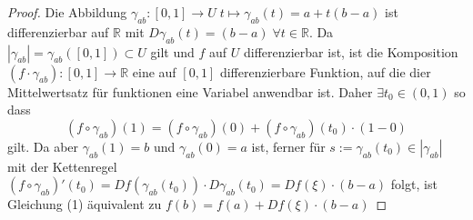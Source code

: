\begin{proof}
	Die Abbildung $ \gamma_{ab}: [0,1] \to U \; t \mapsto \gamma_{ab}(t) = a + t(b-a) $ ist differenzierbar auf $ \mathbb{R}  $ 
	mit $ D \gamma_{ab}(t) = (b-a) \; \forall t \in \mathbb{R}  $. Da $ \left| \gamma_{ab} \right| = \gamma_{ab}([0,1]) \subset  U $
	gilt und $ f $ auf $ U $ differenzierbar ist, ist die Komposition $ \left( f \cdot \gamma_{ab} \right) : [0,1] \to \mathbb{R}  $ 
	eine auf $ [0,1]  $ differenzierbare Funktion, auf die dier Mittelwertsatz für funktionen eine Variabel anwendbar ist. 
	Daher $ \exists t_0 \in (0,1) $ so dass
	\begin{equation}
	\left( f \circ \gamma_{ab} \right) (1) = \left( f \circ \gamma_{ab} \right) (0) + 
	\left( f \circ \gamma_{ab} \right) (t_0) \cdot (1-0)
	\end{equation}
	gilt. Da aber $ \gamma_{ab}(1) = b $ und $ \gamma_{ab}(0) = a $ ist,
	ferner für $ s := \gamma_{ab}(t_0) \in \left| \gamma_{ab} \right| $ mit der Kettenregel $ \left( f \circ \gamma_{ab} \right)'
	(t_0) = Df \left( \gamma _{ab}(t_0) \right) \cdot D \gamma _{ab}(t_0) = Df( \xi) \cdot (b-a)$ folgt, ist Gleichung (1) 
	äquivalent zu $ f(b) = f(a) + Df(\xi)\cdot(b-a) $ 
\end{proof}


%
